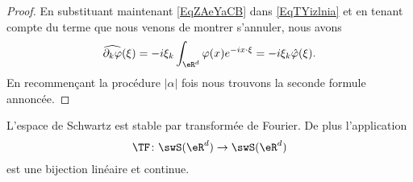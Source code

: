 \begin{proof}
    En substituant maintenant \eqref{EqZAeYaCB} dans \eqref{EqTYizlnia} et en tenant compte du terme que nous venons de montrer s'annuler, nous avons
    \begin{equation}
        \widehat{\partial_k\varphi}(\xi)=-i\xi_k\int_{\eR^d}\varphi(x) e^{-ix\cdot \xi}=-i\xi_k\hat\varphi(\xi).
    \end{equation}
    En recommençant la procédure \( | \alpha |\) fois nous trouvons la seconde formule annoncée.
\end{proof}

\begin{proposition} \label{PropKPsjyzT}
    L'espace de Schwartz est stable par transformée de Fourier. De plus l'application
    \begin{equation}
        \TF\colon \swS(\eR^d)\to \swS(\eR^d)
    \end{equation}
    est une bijection linéaire et continue.
\end{proposition}

